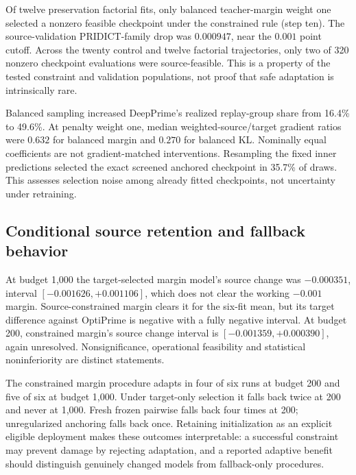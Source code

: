 Of twelve preservation factorial fits, only balanced teacher-margin weight one selected a nonzero feasible checkpoint under the constrained rule (step ten). The source-validation PRIDICT-family drop was $0.000947$, near the $0.001$ point cutoff. Across the twenty control and twelve factorial trajectories, only two of 320 nonzero checkpoint evaluations were source-feasible. This is a property of the tested constraint and validation populations, not proof that safe adaptation is intrinsically rare.

Balanced sampling increased DeepPrime's realized replay-group share from 16.4\% to 49.6\%. At penalty weight one, median weighted-source/target gradient ratios were $0.632$ for balanced margin and $0.270$ for balanced KL. Nominally equal coefficients are not gradient-matched interventions. Resampling the fixed inner predictions selected the exact screened anchored checkpoint in 35.7\% of draws. This assesses selection noise among already fitted checkpoints, not uncertainty under retraining.




\subsection{Conditional source retention and fallback behavior}
At budget 1,000 the target-selected margin model's source change was $-0.000351$, interval $[-0.001626,+0.001106]$, which does not clear the working $-0.001$ margin. Source-constrained margin clears it for the six-fit mean, but its target difference against OptiPrime is negative with a fully negative interval. At budget 200, constrained margin's source change interval is $[-0.001359,+0.000390]$, again unresolved. Nonsignificance, operational feasibility and statistical noninferiority are distinct statements.

The constrained margin procedure adapts in four of six runs at budget 200 and five of six at budget 1,000. Under target-only selection it falls back twice at 200 and never at 1,000. Fresh frozen pairwise falls back four times at 200; unregularized anchoring falls back once. Retaining initialization as an explicit eligible deployment makes these outcomes interpretable: a successful constraint may prevent damage by rejecting adaptation, and a reported adaptive benefit should distinguish genuinely changed models from fallback-only procedures.

